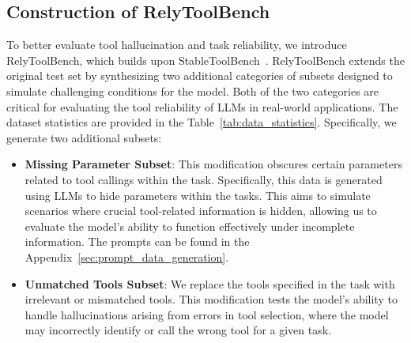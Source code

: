 

\subsection{Construction of RelyToolBench}

To better evaluate tool hallucination and task reliability, we introduce RelyToolBench, which builds upon StableToolBench~\cite{guo2024stabletoolbench}. RelyToolBench extends the original test set by synthesizing two additional categories of subsets designed to simulate challenging conditions for the model. Both of the two categories are critical for evaluating the tool reliability of LLMs in real-world applications.  The dataset statistics are provided in the Table~\ref{tab:data_statistics}. Specifically, we generate two additional subsets:

\begin{itemize}
\item \textbf{Missing Parameter Subset}: This modification obscures certain parameters related to tool callings within the task. Specifically, this data is generated using LLMs to hide parameters within the tasks. This aims to simulate scenarios where crucial tool-related information is hidden, allowing us to evaluate the model’s ability to function effectively under incomplete information. The prompts can be found in the Appendix~\ref{sec:prompt_data_generation}.
\item \textbf{Unmatched Tools Subset}: We replace the tools specified in the task with irrelevant or mismatched tools. This modification tests the model’s ability to handle hallucinations arising from errors in tool selection, where the model may incorrectly identify or call the wrong tool for a given task.
\end{itemize}



